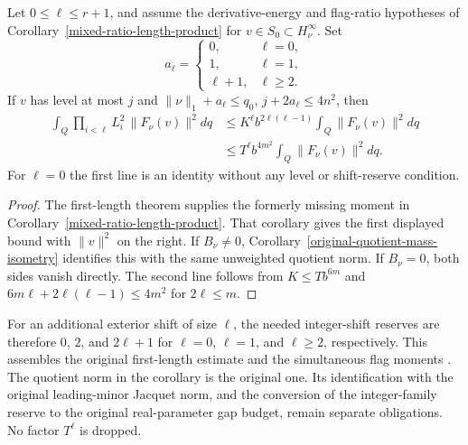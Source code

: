 \begin{corollary}\label{original-flag-product-norm-bound}
Let $0\le\ell\le r+1$, and assume the derivative-energy and
flag-ratio hypotheses of Corollary~\ref{mixed-ratio-length-product}
for $v\in S_0\subset H_\nu^\infty$.  Set
\[
 a_\ell=\begin{cases}
 0,&\ell=0,\\
 1,&\ell=1,\\
 \ell+1,&\ell\ge2.
 \end{cases}
\]
If $v$ has level at most $j$ and
$\|\nu\|_1+a_\ell\le q_0$, $j+2a_\ell\le4n^2$, then
\begin{align*}
 \int_Q\prod_{i<\ell}L_i^2\,\|F_\nu(v)\|^2dq
 &\le K^\ell b^{2\ell(\ell-1)}
                           \int_Q\|F_\nu(v)\|^2dq\\
 &\le T^\ell b^{4m^2}\int_Q\|F_\nu(v)\|^2dq.
\end{align*}
For $\ell=0$ the first line is an identity without any level or
shift-reserve condition.
\end{corollary}
\begin{proof}
The first-length theorem supplies the formerly missing moment in
Corollary~\ref{mixed-ratio-length-product}.  That corollary gives
the first displayed bound with $\|v\|^2$ on the right.
If $B_\nu\ne0$, Corollary~\ref{original-quotient-mass-isometry}
identifies this with the same unweighted quotient norm.  If
$B_\nu=0$, both sides vanish directly.  The second line follows
from $K\le T b^{6m}$ and
$6m\ell+2\ell(\ell-1)\le4m^2$ for $2\ell\le m$.
\end{proof}

For an additional exterior shift of size $\ell$, the needed
integer-shift reserves are therefore $0$, $2$, and $2\ell+1$
for $\ell=0$, $\ell=1$, and $\ell\ge2$, respectively.  This
assembles the original first-length estimate and the simultaneous
flag moments \cite{first-length-original-recursion}.  The quotient
norm in the corollary is the original one.  Its identification with
the original leading-minor Jacquet norm, and the conversion of the
integer-family reserve to the original real-parameter gap budget,
remain separate obligations.  No factor $T^\ell$ is dropped.
